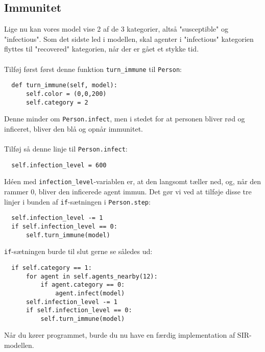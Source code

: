 \documentclass{article}
\begin{document}
\subsection{Immunitet}
Lige nu kan vores model vise 2 af de 3 kategorier, altså "susceptible" og "infectious". Som det sidste led i modellen, skal agenter i "infectious" kategorien flyttes til "recovered" kategorien, når der er gået et stykke tid.\\\\
Tilføj først først denne funktion \texttt{turn\_immune} til \texttt{Person}:
\begin{lstlisting}
  def turn_immune(self, model):
      self.color = (0,0,200)
      self.category = 2
\end{lstlisting}
Denne minder om \texttt{Person.infect}, men i stedet for at personen bliver rød og inficeret, bliver den blå og opnår immunitet.\\\\
Tilføj så denne linje til \texttt{Person.infect}:
\begin{lstlisting}
  self.infection_level = 600
\end{lstlisting}
Idéen med \texttt{infection\_level}-variablen er, at den langsomt tæller ned, og, når den rammer 0, bliver den inficerede agent immun. Det gør vi ved at tilføje disse tre linjer i bunden af \texttt{if}-sætningen i \texttt{Person.step}:
\begin{lstlisting}
  self.infection_level -= 1
  if self.infection_level == 0:
      self.turn_immune(model)
\end{lstlisting}
\texttt{if}-sætningen burde til slut gerne se således ud:
\begin{lstlisting}
  if self.category == 1:
      for agent in self.agents_nearby(12):
          if agent.category == 0:
              agent.infect(model)
      self.infection_level -= 1
      if self.infection_level == 0:
          self.turn_immune(model)
\end{lstlisting}
Når du kører programmet, burde du nu have en færdig implementation af SIR-modellen.
\end{document}
